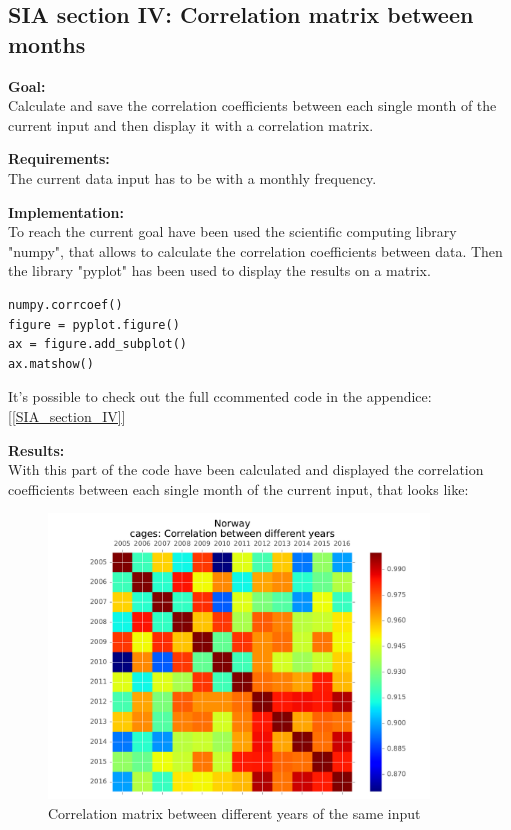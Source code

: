 \newpage
\subsection{SIA section IV: Correlation matrix between months}

\textbf{Goal:}\\
Calculate and save the correlation coefficients between each single month of the current input and then display it with a correlation matrix.

\textbf{Requirements:}\\
The current data input has to be with a monthly frequency. 

\textbf{Implementation:}\\
To reach the current goal have been used the scientific computing library "numpy", that allows to calculate the correlation coefficients between data. Then the library "pyplot" has been used to display the results on a matrix.

\begin{lstlisting}
numpy.corrcoef()
figure = pyplot.figure()
ax = figure.add_subplot()
ax.matshow()
\end{lstlisting}

It's possible to check out the full ccommented code in the appendice: [\ref{SIA_section_IV}]


\textbf{Results:} \\
With this part of the code have been calculated and displayed the correlation coefficients between each single month of the current input, that looks like: 

\begin{figure}[H]
	\centering
    \includegraphics[width=0.9\textwidth]{Files/Cages_Years_Matrix.pdf}
    \caption{Correlation matrix between different years of the same input}
\end{figure}


